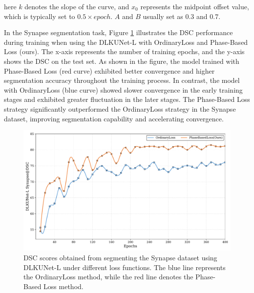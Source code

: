 \documentclass[sn-mathphys-num]{sn-jnl}
\theoremstyle{thmstyleone}%
\theoremstyle{thmstyletwo}%
\theoremstyle{thmstylethree}%
\begin{document}
here \(k\) denotes the slope of the curve, and \(x_0\) represents the midpoint offset value, which is typically set to \(0.5\times epoch\).
\(A\) and \(B\) usually set as \(0.3\) and \(0.7\).

In the Synapse segmentation task, Figure \ref{fig5} illustrates the DSC performance during training when using the DLKUNet-L with OrdinaryLoss and Phase-Based Loss (ours).
The x-axis represents the number of training epochs, and the y-axis shows the DSC on the test set. 
As shown in the figure, the model trained with Phase-Based Loss (red curve) exhibited better convergence and higher segmentation accuracy throughout the training process.
In contrast, the model with OrdinaryLoss (blue curve) showed slower convergence in the early training stages and exhibited greater fluctuation in the later stages.
The Phase-Based Loss strategy significantly outperformed the OrdinaryLoss strategy in the Synapse dataset, improving segmentation capability and accelerating convergence.

\begin{figure}[ht]
    \centering
    \includegraphics[width=\textwidth]{figure5.pdf}
    \caption{DSC scores obtained from segmenting the Synapse dataset using DLKUNet-L under different loss functions.
    The blue line represents the OrdinaryLoss method, while the red line denotes the Phase-Based Loss method.}\label{fig5}
\end{figure}
\end{document}
